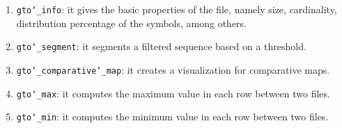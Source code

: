 \begin{enumerate}
\item \texttt{gto\char`_info}: it gives the basic properties of the file, namely size, cardinality, distribution percentage of the symbols, among others.

\item \texttt{gto\char`_segment}: it segments a filtered sequence based on a threshold.

\item \texttt{gto\char`_comparative\char`_map}: it creates a visualization for comparative maps.

\item \texttt{gto\char`_max}: it computes the maximum value in each row between two files.

\item \texttt{gto\char`_min}: it computes the minimum value in each row between two files.

\end{enumerate}
















